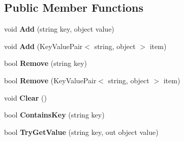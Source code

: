 \subsection*{Public Member Functions}
\begin{DoxyCompactItemize}
\item 
\hypertarget{class__1aarsproeve_1_1_common_1_1_observable_dictionary_a787ca1cf8774aa56af9dafe6e3200149}{}void {\bfseries Add} (string key, object value)\label{class__1aarsproeve_1_1_common_1_1_observable_dictionary_a787ca1cf8774aa56af9dafe6e3200149}

\item 
\hypertarget{class__1aarsproeve_1_1_common_1_1_observable_dictionary_a12559d5154e64bfa5b5fa2aac2785350}{}void {\bfseries Add} (Key\+Value\+Pair$<$ string, object $>$ item)\label{class__1aarsproeve_1_1_common_1_1_observable_dictionary_a12559d5154e64bfa5b5fa2aac2785350}

\item 
\hypertarget{class__1aarsproeve_1_1_common_1_1_observable_dictionary_a5be619bb4f70f093b6b6adf6f5782586}{}bool {\bfseries Remove} (string key)\label{class__1aarsproeve_1_1_common_1_1_observable_dictionary_a5be619bb4f70f093b6b6adf6f5782586}

\item 
\hypertarget{class__1aarsproeve_1_1_common_1_1_observable_dictionary_af32c84e07c21c32b99b406946c5908ab}{}bool {\bfseries Remove} (Key\+Value\+Pair$<$ string, object $>$ item)\label{class__1aarsproeve_1_1_common_1_1_observable_dictionary_af32c84e07c21c32b99b406946c5908ab}

\item 
\hypertarget{class__1aarsproeve_1_1_common_1_1_observable_dictionary_a2efbbb5591cdf7302dd208e2a92e9ab9}{}void {\bfseries Clear} ()\label{class__1aarsproeve_1_1_common_1_1_observable_dictionary_a2efbbb5591cdf7302dd208e2a92e9ab9}

\item 
\hypertarget{class__1aarsproeve_1_1_common_1_1_observable_dictionary_a91c13bcece087cdf96bf9eb68e261415}{}bool {\bfseries Contains\+Key} (string key)\label{class__1aarsproeve_1_1_common_1_1_observable_dictionary_a91c13bcece087cdf96bf9eb68e261415}

\item 
\hypertarget{class__1aarsproeve_1_1_common_1_1_observable_dictionary_acabb354db7da378b539a6c28d12b9e62}{}bool {\bfseries Try\+Get\+Value} (string key, out object value)\label{class__1aarsproeve_1_1_common_1_1_observable_dictionary_acabb354db7da378b539a6c28d12b9e62}


\end{DoxyCompactItemize}
